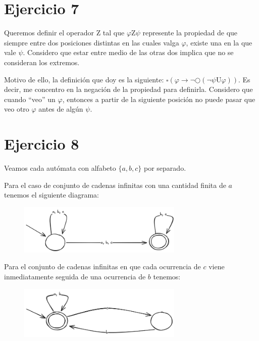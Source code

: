 \documentclass{article}
\begin{document}
\section*{Ejercicio 7}
Queremos definir el operador $\text{Z}$ tal que $\varphi \text{Z} \psi$ represente la propiedad de que siempre entre dos posiciones distintas en las cuales valga $\varphi$, existe una en la que vale $\psi$.
Considero que estar entre medio de las otras dos implica que no se consideran los extremos.

Motivo de ello, la definición que doy es la siguiente: $\square(\varphi \to \neg\bigcirc(\neg\psi \text{U} \varphi))$.
Es decir, me concentro en la negación de la propiedad para definirla.
Considero que cuando ``veo'' un $\varphi$, entonces a partir de la siguiente posición no puede pasar que veo otro $\varphi$ antes de algún $\psi$.

\section*{Ejercicio 8}
Veamos cada autómata con alfabeto $\{a, b, c\}$ por separado.

Para el caso de conjunto de cadenas infinitas con una cantidad finita de $a$ tenemos el siguiente diagrama:
\begin{figure}[!htb]
	\includegraphics[width=0.7\textwidth]{04-08-a.png}
	\centering
\end{figure}

Para el conjunto de cadenas infinitas en que cada ocurrencia de $c$ viene inmediatamente seguida de una ocurrencia de $b$ tenemos:
\begin{figure}[!htb]
	\includegraphics[width=0.7\textwidth]{04-08-b.png}
	\centering
\end{figure}
\end{document}
